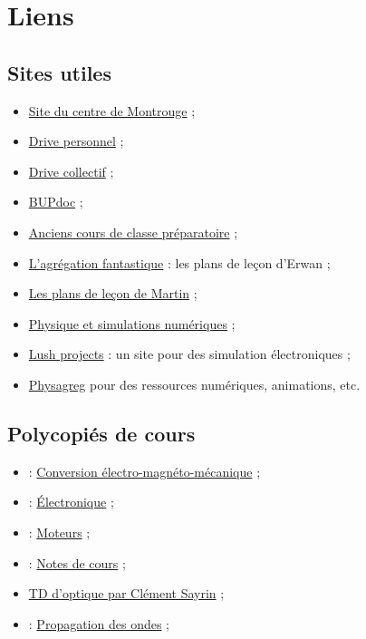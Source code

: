 \chapter*{Liens}

\section*{Sites utiles}

\begin{itemize}
\item \href{http://ressources.agreg.phys.ens.fr/index}{Site du centre de Montrouge} ;
\item \href{https://drive.google.com/drive/folders/1k25PmoJLoWdJqkvU63OvsjhtP5SWEFPo?usp=sharing}{Drive personnel} ;
\item \href{https://drive.google.com/drive/folders/1Xz8t7SrdGd-0hLLhcAqeeyTuv98uMSQ1?usp=sharing}{Drive collectif} ;
\item \href{http://bupdoc.udppc.asso.fr/consultation/selections.php}{BUPdoc} ;
\item \href{http://www.joelsornette.fr/}{Anciens cours de classe préparatoire} ;
\item \href {https://studylibfr.com/doc/2383850/l-agr\%C3\%A9gation-fantastique}{L'agrégation fantastique} : les plans de leçon d'Erwan ;
\item \href{https://drive.google.com/drive/folders/1wgFxMkxD-4UWiHGE1ZdUXB98ikuZ6FL-}{Les plans de leçon de Martin} ;
\item \href{http://ressources.univ-lemans.fr/AccesLibre/UM/Pedago/physique/02/}{Physique et simulations numériques} ;
\item \href{https://lushprojects.com/circuitjs/}{Lush projects} : un site pour des simulation électroniques ;
\item \href{http://www.physagreg.fr/animations.php}{Physagreg} pour des ressources numériques, animations, etc.
\end{itemize}

\section*{Polycopiés de cours}

\begin{itemize}
\item \cite{Naval} : \href{https://lnspe2.fr/Cours_Phys/CP02.pdf}{Conversion électro-magnéto-mécanique} ;
\item \cite{Neveu2019a} : \href{https://gitlab.in2p3.fr/Jeremy/Electronique}{Électronique} ;
\item \cite{Neveu2019} : \href{https://gitlab.in2p3.fr/Jeremy/Moteurs}{Moteurs} ;
\item \cite{Rabaud2019} : \href{http://www.fast.u-psud.fr/~rabaud/}{Notes de cours} ;
\item \href{http://www.lkb.upmc.fr/cqed/teaching/teachingsayrin/}{TD d'optique par Clément Sayrin} ;
\item \cite{Thibierge2014} : \href{https://www.etienne-thibierge.fr/agreg/ondes_poly_2015.pdf}{Propagation des ondes} ;
\end{itemize}


